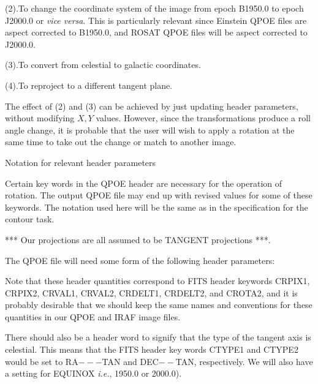 \item{(2).}To change the coordinate system of the image from epoch
B1950.0
to epoch J2000.0 or {\it vice versa}.  This is particularly relevant
since Einstein QPOE files are aspect corrected to B1950.0, and
ROSAT QPOE files will be aspect corrected to J2000.0.

\item{(3).}To convert from celestial to galactic coordinates.

\item{(4).}To reproject to a different tangent plane.

The effect of (2) and (3) can be achieved by just updating header
parameters, without modifying $X,Y$ values.  However, since the
transformations produce a roll angle change, it is probable that the
user will wish to apply a rotation at the same time to take out the
change or match to another image.

\@{Notation for relevant header parameters}

Certain key words in the QPOE header are necessary for the operation
of rotation.  The output QPOE file may end up with revised values for some of these
keywords.  The notation used here will be the same as in the
specification for the contour task.

*** Our projections are all assumed to be TANGENT projections ***.

The QPOE file will need some form of the
following header parameters:

\vbox{
}

Note that these header quantities correspond to FITS header keywords
CRPIX1, CRPIX2, CRVAL1, CRVAL2, CRDELT1, CRDELT2, and CROTA2, and it
is probably desirable that we should keep the same names and
conventions for these quantities in our QPOE and IRAF image files.

There should also be a header word to signify that the type of the tangent
axis is celestial.  This means that the FITS header key words
CTYPE1 and CTYPE2 would be set to
RA$---$TAN and DEC$--$TAN, respectively.  We will also have
a setting for EQUINOX {\it i.e.}, 1950.0 or 2000.0).


